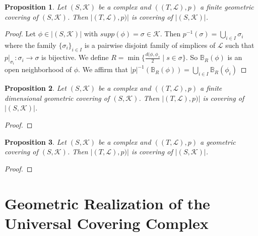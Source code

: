 \documentclass{amsart}
\newtheorem{proposition}{Proposition}[section]
\begin{document}
\begin{proposition}
Let $(S,\mathcal{K})$ be a complex and $((T,\mathcal{L}),p)$ a finite geometric covering of $(S,\mathcal{K})$. Then $\vert (T,\mathcal{L}), p)\vert $ is covering of $\vert (S,\mathcal{K})\vert$.
\end{proposition}

\begin{proof}
Let $\phi\in \vert (S,\mathcal{K})\vert$ with $supp(\phi)=\sigma\in\mathcal{K}$. Then $p^{-1}(\sigma)=\bigcup_{i\in I}\sigma_i$ where the family $\{\sigma_i\}_{i\in I}$ is a pairwise disjoint family of simplices of $\mathcal{L}$ such that $p|_{\sigma_i}\colon \sigma_i\longrightarrow \sigma$ is bijective.  We define $R=\min\{\frac{d(\phi,\phi_s}{2}\mid s\in\sigma\}$. So $\mathbb{B}_R(\phi)$ is an open neighborhood of $\phi$. We affirm that $\vert p\vert^{-1}(\mathbb{B}_R(\phi))=\bigcup_{i\in I}\mathbb{B}_R(\phi_i)$
\end{proof}

\begin{proposition}
Let $(S,\mathcal{K})$ be a complex and $((T,\mathcal{L}),p)$ a finite dimensional geometric covering of $(S,\mathcal{K})$. Then $\vert (T,\mathcal{L}), p)\vert $ is covering of $\vert (S,\mathcal{K})\vert$.
\end{proposition}

\begin{proof}

\end{proof}

\begin{proposition}
Let $(S,\mathcal{K})$ be a complex and $((T,\mathcal{L}),p)$ a geometric covering of $(S,\mathcal{K})$. Then $\vert (T,\mathcal{L}), p)\vert $ is covering of $\vert (S,\mathcal{K})\vert$.
\end{proposition}

\begin{proof}

\end{proof}


\section{Geometric Realization of the Universal Covering Complex}





\end{document}
